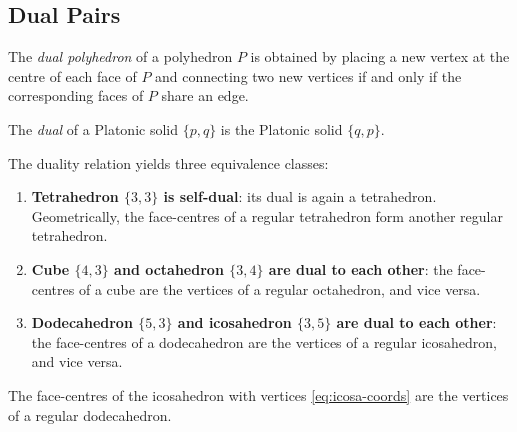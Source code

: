 
\subsection{Dual Pairs}
\label{sec:dual-pairs}

The \emph{dual polyhedron} of a polyhedron $P$ is obtained by placing a
new vertex at the centre of each face of $P$ and connecting two new vertices
if and only if the corresponding faces of $P$ share an edge.

\begin{definition}
\label{def:dual}
The \emph{dual} of a Platonic solid $\{p,q\}$ is the Platonic solid
$\{q,p\}$.
\end{definition}

The duality relation yields three equivalence classes:
\begin{enumerate}
  \item \textbf{Tetrahedron $\{3,3\}$ is self-dual}: its dual is again
        a tetrahedron.  Geometrically, the face-centres of a regular
        tetrahedron form another regular tetrahedron.
  \item \textbf{Cube $\{4,3\}$ and octahedron $\{3,4\}$ are dual to each
        other}: the face-centres of a cube are the vertices of a regular
        octahedron, and vice versa.
  \item \textbf{Dodecahedron $\{5,3\}$ and icosahedron $\{3,5\}$ are dual
        to each other}: the face-centres of a dodecahedron are the vertices
        of a regular icosahedron, and vice versa.
\end{enumerate}

\begin{proposition}
\label{prop:icosa-dodeca-dual}
The face-centres of the icosahedron with vertices \eqref{eq:icosa-coords}
are the vertices of a regular dodecahedron.
\end{proposition}

